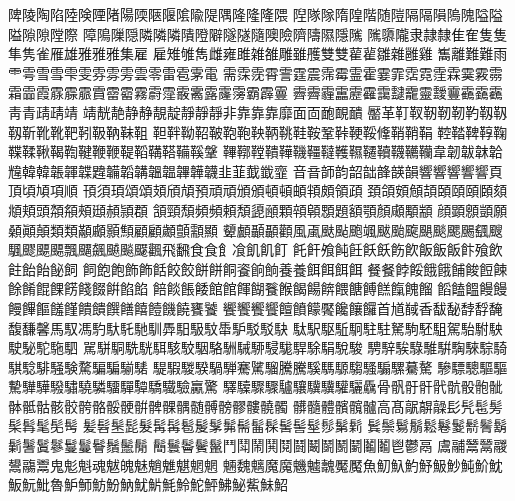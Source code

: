 陴󠄀陵󠄀陶󠄀陷󠄀陸󠄀険󠄀陻󠄀陼󠄀陽󠄀陾󠄀陿󠄀隁󠄀隂󠄀隃󠄀隄󠄀隅󠄀隆󠄀隆󠄁隆󠄂隈󠄀
隉󠄀隊󠄀隊󠄁隋󠄀隍󠄀階󠄀随󠄀隑󠄀隔󠄀隔󠄁隕󠄀隖󠄀隗󠄀隘󠄀隘󠄁隘󠄂隙󠄀隙󠄁隚󠄀際󠄀
障󠄀隝󠄀隟󠄀隠󠄀隣󠄀隣󠄁隣󠄂隤󠄀隥󠄀隦󠄀隧󠄀隧󠄁隨󠄀隩󠄀險󠄀隮󠄀隯󠄀隰󠄀隱󠄀隲󠄀
隲󠄁隳󠄀隴󠄀隶󠄀隷󠄀隸󠄀隹󠄀隺󠄀隻󠄀隻󠄁隼󠄀隽󠄀雀󠄀雁󠄀雄󠄀雅󠄀雅󠄁雅󠄂集󠄀雇󠄀
雇󠄁雉󠄀雊󠄀雋󠄀雌󠄀雍󠄀雎󠄀雑󠄀雒󠄀雕󠄀雖󠄀雘󠄀雙󠄀雙󠄁雚󠄀雚󠄁雛󠄀雜󠄀雝󠄀雞󠄀
雟󠄀離󠄀難󠄀難󠄁雨󠄀雨󠄁雩󠄀雪󠄀雪󠄁雫󠄀雯󠄀雰󠄀雰󠄁雱󠄀雲󠄀零󠄀雷󠄀雹󠄀雺󠄀電󠄀
需󠄀霂󠄀霃󠄀霄󠄀霅󠄀霆󠄀震󠄀霈󠄀霉󠄀霊󠄀霍󠄀霎󠄀霏󠄀霑󠄀霓󠄀霔󠄀霖󠄀霙󠄀霚󠄀霛󠄀
霜󠄀霝󠄀霞󠄀霡󠄀霡󠄁霢󠄀霣󠄀霤󠄀霤󠄁霧󠄀霨󠄀霪󠄀霰󠄀霱󠄀露󠄀霳󠄀霶󠄀霸󠄀霹󠄀霻󠄀
霽󠄀霽󠄁霾󠄀靁󠄀靂󠄀靃󠄀靄󠄀靆󠄀靇󠄀靈󠄀靉󠄀靊󠄀靍󠄀靎󠄀靏󠄀靑󠄀青󠄀靕󠄀靕󠄁靖󠄀
靖󠄁靗󠄀靘󠄀静󠄀静󠄁靚󠄀靛󠄀靜󠄀靜󠄁靜󠄂非󠄀靠󠄀靠󠄁靠󠄂靡󠄀面󠄀靣󠄀靤󠄀靦󠄀靧󠄀
靨󠄀革󠄀靪󠄀靫󠄀靭󠄀靭󠄁靭󠄂靮󠄀靱󠄀靱󠄁靱󠄂靳󠄀靴󠄀靴󠄁靶󠄀靷󠄀靸󠄀靹󠄀靺󠄀靻󠄀
靼󠄀靽󠄀靿󠄀鞀󠄀鞁󠄀鞄󠄀鞄󠄁鞅󠄀鞆󠄀鞉󠄀鞋󠄀鞍󠄀鞏󠄀鞐󠄀鞕󠄀鞖󠄀鞗󠄀鞘󠄀鞘󠄁鞙󠄀
鞚󠄀鞜󠄀鞞󠄀鞟󠄀鞠󠄀鞢󠄀鞣󠄀鞦󠄀鞨󠄀鞫󠄀鞬󠄀鞭󠄀鞭󠄁鞮󠄀鞱󠄀鞲󠄀鞳󠄀鞴󠄀鞵󠄀鞶󠄀
鞸󠄀鞹󠄀鞺󠄀鞼󠄀鞾󠄀鞿󠄀韁󠄀韃󠄀韄󠄀韅󠄀韆󠄀韇󠄀韈󠄀韉󠄀韊󠄀韋󠄀韌󠄀韍󠄀韎󠄀韐󠄀
韑󠄀韓󠄀韓󠄁韔󠄀韗󠄀韘󠄀韙󠄀韛󠄀韜󠄀韝󠄀韞󠄀韞󠄁韠󠄀韡󠄀韤󠄀韭󠄀韮󠄀韯󠄀韱󠄀韲󠄀
音󠄀音󠄁韴󠄀韵󠄀韶󠄀韷󠄀韸󠄀韺󠄀韻󠄀響󠄀響󠄁響󠄂響󠄃響󠄄頁󠄀頂󠄀頃󠄀頄󠄀項󠄀順󠄀
頇󠄀須󠄀頊󠄀頌󠄀頌󠄁頍󠄀頎󠄀頏󠄀預󠄀頑󠄀頑󠄁頒󠄀頒󠄁頓󠄀頓󠄁頔󠄀頖󠄀頗󠄀領󠄀頙󠄀
頚󠄀頜󠄀頞󠄀頠󠄀頡󠄀頣󠄀頤󠄀頤󠄁頥󠄀頦󠄀頫󠄀頬󠄀頭󠄀頮󠄀頯󠄀頰󠄀頲󠄀頳󠄀頴󠄀頵󠄀
頷󠄀頸󠄀頹󠄀頻󠄀頻󠄁頼󠄀頽󠄀頾󠄀顄󠄀顆󠄀顇󠄀顊󠄀顋󠄀題󠄀額󠄀顎󠄀顏󠄀顑󠄀顒󠄀顓󠄀
顔󠄀顕󠄀顖󠄀顗󠄀願󠄀顙󠄀顚󠄀顛󠄀類󠄀類󠄁顢󠄀顣󠄀顥󠄀顦󠄀顧󠄀顧󠄁顪󠄀顫󠄀顬󠄀顯󠄀
顰󠄀顱󠄀顳󠄀顳󠄁顴󠄀風󠄀颪󠄀颫󠄀颭󠄀颮󠄀颯󠄀颰󠄀颱󠄀颴󠄀颶󠄀颷󠄀颸󠄀颺󠄀颻󠄀颼󠄀
颿󠄀飂󠄀飃󠄀飃󠄁飄󠄀飅󠄀飆󠄀飇󠄀飈󠄀飋󠄀飌󠄀飛󠄀飜󠄀食󠄀食󠄁飠󠄀飡󠄀飢󠄀飢󠄁飣󠄀
飥󠄀飦󠄀飧󠄀飩󠄀飪󠄀飫󠄀飫󠄁飭󠄀飮󠄀飯󠄀飯󠄁飯󠄂飰󠄀飱󠄀飲󠄀飳󠄀飴󠄀飴󠄁飶󠄀飼󠄀
飼󠄁飽󠄀飽󠄁飾󠄀飾󠄁餂󠄀餃󠄀餃󠄁餅󠄀餅󠄁餇󠄀餈󠄀餉󠄀餉󠄁養󠄀養󠄁餌󠄀餌󠄁餌󠄂餌󠄃
餐󠄀餐󠄁餑󠄀餒󠄀餓󠄀餓󠄁餔󠄀餕󠄀餖󠄀餗󠄀餘󠄀餚󠄀餛󠄀餜󠄀餝󠄀餞󠄀餟󠄀餠󠄀餡󠄀餡󠄁
餢󠄀餤󠄀餦󠄀餧󠄀館󠄀館󠄁餫󠄀餬󠄀餮󠄀餱󠄀餲󠄀餳󠄀餴󠄀餵󠄀餹󠄀餺󠄀餻󠄀餼󠄀餽󠄀餾󠄀
饀󠄀饁󠄀饂󠄀饅󠄀饅󠄁饅󠄂饆󠄀饇󠄀饈󠄀饉󠄀饋󠄀饋󠄁饌󠄀饍󠄀饎󠄀饐󠄀饑󠄀饒󠄀饔󠄀饕󠄀
饗󠄀饗󠄁饗󠄂饗󠄃饘󠄀饙󠄀饛󠄀饜󠄀饞󠄀饟󠄀饠󠄀首󠄀馗󠄀馘󠄀香󠄀馛󠄀馝󠄀馞󠄀馟󠄀馣󠄀
馥󠄀馦󠄀馨󠄀馬󠄀馭󠄀馮󠄀馰󠄀馱󠄀馲󠄀馳󠄀馴󠄀馵󠄀馹󠄀馺󠄀馼󠄀馽󠄀馿󠄀駁󠄀駁󠄁駃󠄀
駄󠄀駅󠄀駆󠄀駈󠄀駉󠄀駐󠄀駐󠄁駑󠄀駒󠄀駓󠄀駔󠄀駕󠄀駘󠄀駙󠄀駚󠄀駛󠄀駜󠄀駝󠄀駞󠄀駟󠄀
駡󠄀駢󠄀駧󠄀駪󠄀駫󠄀駬󠄀駭󠄀駮󠄀駰󠄀駱󠄀駲󠄀駴󠄀駵󠄀駸󠄀駹󠄀駻󠄀駼󠄀駽󠄀駾󠄀駿󠄀
騁󠄀騂󠄀騃󠄀騄󠄀騅󠄀騈󠄀騊󠄀騋󠄀騌󠄀騎󠄀騏󠄀騐󠄀騑󠄀騒󠄀験󠄀騖󠄀騙󠄀騙󠄁騚󠄀騞󠄀
騠󠄀騢󠄀騣󠄀騤󠄀騧󠄀騨󠄀騫󠄀騭󠄀騮󠄀騰󠄀騰󠄁騱󠄀騳󠄀騵󠄀騶󠄀騷󠄀騸󠄀騾󠄀驀󠄀驁󠄀
驂󠄀驃󠄀驄󠄀驅󠄀驅󠄁驇󠄀驊󠄀驊󠄁驋󠄀驌󠄀驍󠄀驎󠄀驑󠄀驒󠄀驔󠄀驕󠄀驖󠄀驗󠄀驘󠄀驚󠄀
驛󠄀驝󠄀驟󠄀驟󠄁驢󠄀驤󠄀驥󠄀驥󠄁驩󠄀驪󠄀驫󠄀骨󠄀骪󠄀骬󠄀骭󠄀骮󠄀骯󠄀骰󠄀骲󠄀骴󠄀
骵󠄀骶󠄀骷󠄀骸󠄀骹󠄀骻󠄀骼󠄀骽󠄀骾󠄀骿󠄀髀󠄀髁󠄀髃󠄀髄󠄀髆󠄀髈󠄀髎󠄀髏󠄀髐󠄀髑󠄀
髒󠄀髓󠄀體󠄀髕󠄀髖󠄀髗󠄀高󠄀髙󠄀髛󠄀髜󠄀髞󠄀髟󠄀髠󠄀髢󠄀髣󠄀髤󠄀髥󠄀髦󠄀髧󠄀髩󠄀
髪󠄀髫󠄀髬󠄀髭󠄀髮󠄀髯󠄀髯󠄁髱󠄀髲󠄀髳󠄀髴󠄀髵󠄀髷󠄀髹󠄀髺󠄀髻󠄀髽󠄀髿󠄀鬀󠄀鬁󠄀
鬂󠄀鬃󠄀鬄󠄀鬅󠄀鬆󠄀鬈󠄀鬉󠄀鬋󠄀鬌󠄀鬍󠄀鬎󠄀鬐󠄀鬒󠄀鬖󠄀鬘󠄀鬘󠄁鬙󠄀鬚󠄀鬛󠄀鬜󠄀
鬝󠄀鬟󠄀鬠󠄀鬢󠄀鬣󠄀鬥󠄀鬦󠄀鬧󠄀鬨󠄀鬩󠄀鬪󠄀鬫󠄀鬬󠄀鬭󠄀鬭󠄁鬮󠄀鬮󠄁鬯󠄀鬱󠄀鬲󠄀
鬳󠄀鬴󠄀鬵󠄀鬵󠄁鬷󠄀鬹󠄀鬺󠄀鬻󠄀鬼󠄀鬽󠄀魁󠄀魂󠄀魃󠄀魄󠄀魅󠄀魈󠄀魋󠄀魌󠄀魍󠄀魍󠄁
魎󠄀魏󠄀魑󠄀魔󠄀魔󠄁魕󠄀魖󠄀魗󠄀魘󠄀魘󠄁魚󠄀魛󠄀魞󠄀魡󠄀魣󠄀魥󠄀魦󠄀魨󠄀魪󠄀魫󠄀
魬󠄀魭󠄀魮󠄀魯󠄀魲󠄀魳󠄀魴󠄀魵󠄀魶󠄀魷󠄀魸󠄀魹󠄀魿󠄀鮀󠄀鮃󠄀鮄󠄀鮅󠄀鮆󠄀鮇󠄀鮉󠄀
